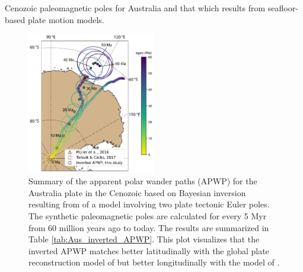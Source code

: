 \documentclass[11pt,letterpaper]{article}
\begin{document}
Cenozoic paleomagnetic poles for Australia and that which results from seafloor-based plate motion models.

\begin{figure}[h!]
\centering
\includegraphics[width=0.5\textwidth]{fig_aus_predicted_APWP.pdf}
\caption{Summary of the apparent polar wander paths (APWP) for the Australia plate in the Cenozoic based on Bayesian inversion resulting from of a model involving two plate tectonic Euler poles. The synthetic paleomagnetic poles are calculated for every 5 Myr from 60 million years ago to today. The results are summarized in Table \ref{tab:Aus_inverted_APWP}. This plot visualizes that the inverted APWP matches better latitudinally with the global plate reconstruction model of \cite{Muller2016a} but better longitudinally with the model of \cite{Torsvik2017a}.}
\label{fig:Aus_inverted_APWP}
\end{figure}
\end{document}
